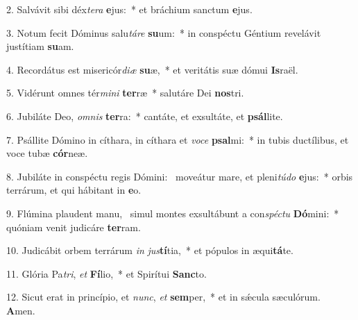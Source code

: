 2. Salvávit sibi déx\textit{te}\textit{ra} \textbf{e}jus:~*  et bráchium sanctum \textbf{e}jus.\

3. Notum fecit Dóminus salu\textit{tá}\textit{re} \textbf{su}um:~*  in conspéctu Géntium revelávit justítiam \textbf{su}am.\

4. Recordátus est misericór\textit{di}\textit{æ} \textbf{su}æ,~*  et veritátis suæ dómui \textbf{Is}raël.\

5. Vidérunt omnes tér\textit{mi}\textit{ni} \textbf{ter}ræ~*  salutáre Dei \textbf{nos}tri.\

6. Jubiláte Deo, \textit{om}\textit{nis} \textbf{ter}ra:~*  cantáte, et exsultáte, et \textbf{psál}lite.\

7. Psállite Dómino in cíthara, in cíthara et \textit{vo}\textit{ce} \textbf{psal}mi:~*  in tubis ductílibus, et voce tubæ \textbf{cór}neæ.\

8. Jubiláte in conspéctu regis Dómini: \dag\  moveátur mare, et pleni\textit{tú}\textit{do} \textbf{e}jus:~*  orbis terrárum, et qui hábitant in \textbf{e}o.\

9. Flúmina plaudent manu, \dag\  simul montes exsultábunt a con\textit{spéc}\textit{tu} \textbf{Dó}mini:~*  quóniam venit judicáre \textbf{ter}ram.\

10. Judicábit orbem terrárum \textit{in} \textit{jus}\textbf{tí}tia,~*  et pópulos in æqui\textbf{tá}te.\

11. Glória Pa\textit{tri}, \textit{et} \textbf{Fí}lio,~*  et Spirítui \textbf{Sanc}to.\

12. Sicut erat in princípio, et \textit{nunc}, \textit{et} \textbf{sem}per,~*  et in sǽcula sæculórum. \textbf{A}men.\


